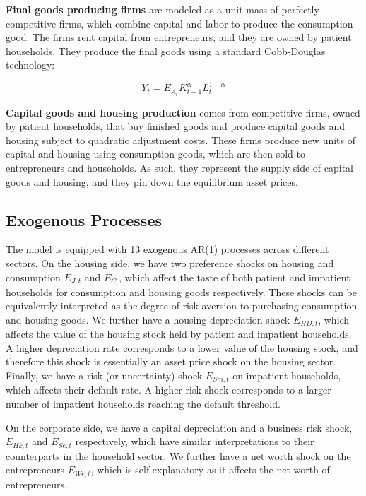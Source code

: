 \documentclass[12pt]{article}
\numberwithin{equation}{section}
\begin{document}
\textbf{Final goods producing firms} are modeled as a unit mass of perfectly competitive firms, which combine capital and labor to produce the consumption good. The firms rent capital from entrepreneurs, and they are owned by patient households. They produce the final goods using a standard Cobb-Douglas technology: 

\begin{equation}
Y_{t}=E_{A_{t}} K^{\alpha}_{t-1}L^{1-\alpha}_{t}
\end{equation}

\textbf{Capital goods and housing production } comes from competitive firms, owned by patient households,  that buy finished goods and produce capital goods and housing subject to quadratic adjustment costs. These firms produce new units of capital and housing using consumption goods, which are then sold to entrepreneurs and households. As such, they represent the supply side of capital goods and housing, and they pin down the equilibrium asset prices. 

\subsection*{Exogenous Processes}


The model is equipped with 13 exogenous AR(1) processes across different sectors. On the housing side, we have two preference shocks on housing and consumption $E_{J,t}$ and $E_{C_t}$, which affect the taste of both patient and impatient households for consumption and housing goods respectively. These shocks can be equivalently interpreted as the degree of risk aversion to purchasing consumption and housing goods. We further have a housing depreciation shock $E_{HD,t}$, which affects the value of the housing stock held by patient and impatient households. A higher depreciation rate corresponds to a lower value of the housing stock, and therefore this shock is essentially an asset price shock on the housing sector. Finally, we have a risk (or uncertainty) shock $E_{Sm,t}$ on impatient households, which affects their default rate. A higher risk shock corresponds to a larger number of impatient households reaching the default threshold. 

On the corporate side, we have a capital depreciation and a business risk shock, $E_{Hk,t}$ and $E_{Se,t}$ respectively, which have similar interpretations to their counterparts in the household sector. We further have a net worth shock on the entrepreneurs $E_{We,t}$, which is self-explanatory as it affects the net worth of entrepreneurs. 
\end{document}
